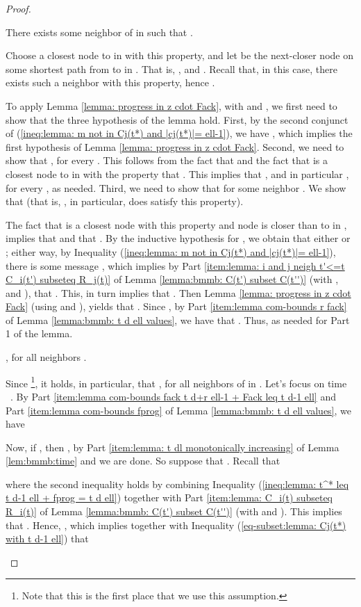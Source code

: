 \begin{proof}
\begin{enumerate}
 There exists some neighbor  of  in  such that .


Choose a closest node  to  in  with this property, and let 
be the next-closer node on some shortest path from  to  in .
That is,
,  and .
Recall that, in this case, there exists such a neighbor  with this property, hence .


To apply Lemma \ref{lemma: progress in z cdot Fack}, with  and , we first need to show that the three hypothesis of the lemma hold.
First, by the second conjunct of (\ref{ineq:lemma: m not in Cj(t*) and |cj(t*)|= ell-1}),
we have , which implies the first hypothesis of Lemma
\ref{lemma: progress in z cdot Fack}.
Second,
we need to show that , for every .
This follows from the fact that  and the fact that  is a closest node to  in  with the property that .
This implies that , and in particular , for every , as needed.
Third, we need to show that  for some neighbor .
We show that  (that is, , in particular, does satisfy this property).


The fact that  is a closest node with this property and node  is closer than  to  in , implies that
 and that .
By the inductive hypothesis for , we obtain that either  or ;
either way, by Inequality
(\ref{ineq:lemma: m not in Cj(t*) and |cj(t*)|= ell-1}),
there is some message ,
which implies by
Part \ref{item:lemma: i and j neigh t'<=t C_i(t') subseteq R_j(t)}
of Lemma \ref{lemma:bmmb: C(t') subset C(t'')}
(with ,  and ),
that .
This, in turn implies that
.
Then Lemma \ref{lemma: progress in z cdot Fack}
(using  and ),
yields that .
Since ,
by Part \ref{item:lemma com-bounds r fack}
of Lemma \ref{lemma:bmmb: t d ell values},
we have that .
Thus,  as needed for Part 1 of the lemma.




 , for all neighbors .

Since 
\footnote{
Note that this is the first place that we use this assumption.
}, it holds, in particular, that , for all neighbors  of  in .
Let's focus on time ~.
By Part \ref{item:lemma com-bounds fack t d+r ell-1 + Fack leq t d-1 ell}
and Part \ref{item:lemma com-bounds fprog}
of Lemma \ref{lemma:bmmb: t d ell values},
we have

Now, if , then , by
Part \ref{item:lemma: t dl monotonically increasing}
of Lemma \ref{lem:bmmb:time} and we are done.
So suppose that .
Recall that

where the second inequality holds by combining
Inequality (\ref{ineq:lemma: t^* leq t d-1 ell + fprog = t d ell})
together with Part \ref{item:lemma: C_i(t) subseteq R_i(t)}
of Lemma \ref{lemma:bmmb: C(t') subset C(t'')}
(with  and ).
This implies that .
Hence, , which implies together with Inequality
(\ref{eq-subset:lemma: Cj(t*) with t d-1 ell})  that




\end{enumerate}
\end{proof}
